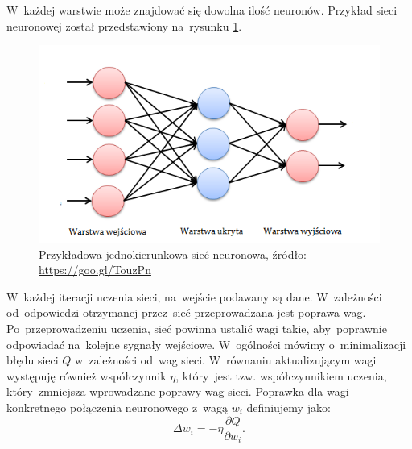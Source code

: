 \noindent
W~każdej warstwie może znajdować się dowolna ilość neuronów. Przykład sieci neuronowej został przedstawiony na~rysunku \ref{net}.
\begin{figure}[ht!]
\centering
\includegraphics{res/exampleNet.png}
\caption[Caption for LOF]{Przykładowa jednokierunkowa sieć neuronowa, źródło: \url{https://goo.gl/TouzPn}\label{net}} 
\end{figure}
\noindent
W~każdej iteracji uczenia sieci, na~wejście podawany są dane. W~zależności od~odpowiedzi otrzymanej przez~sieć przeprowadzana jest poprawa wag. Po~przeprowadzeniu uczenia, sieć powinna ustalić wagi takie, aby~poprawnie odpowiadać na~kolejne sygnały wejściowe. W~ogólności mówimy o~minimalizacji błędu sieci $Q$ w~zależności od~wag sieci. W~równaniu aktualizującym wagi występuję również współczynnik $\eta$, który~jest tzw. współczynnikiem uczenia, który~zmniejsza wprowadzane poprawy wag sieci. Poprawka dla wagi konkretnego połączenia neuronowego z~wagą $w_i$ definiujemy jako:
\begin{equation}\label{deltaRule}
\Delta w_i = - \eta \frac{\partial Q}{\partial w_i}.
\end{equation}
